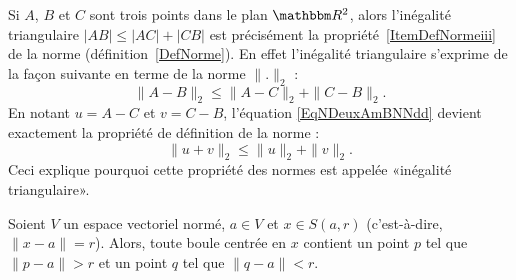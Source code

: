\begin{remark}
	Si $A$, $B$ et $C$ sont trois points dans le plan $\eR^2$, alors l'inégalité triangulaire $| AB |\leq| AC |+| CB |$ est précisément la propriété~\ref{ItemDefNormeiii} de la norme (définition~\ref{DefNorme}). En effet l'inégalité triangulaire s'exprime de la façon suivante en terme de la norme $\| . \|_2$ :
	\begin{equation}	\label{EqNDeuxAmBNNdd}
		\| A-B \|_2\leq \| A-C \|_2+\| C-B \|_2.
	\end{equation}
	En notant $u=A-C$ et $v=C-B$, l'équation \eqref{EqNDeuxAmBNNdd} devient exactement la propriété de définition de la norme :
	\begin{equation}
		\| u+v \|_2\leq \| u \|_2+\| v \|_2.
	\end{equation}
	Ceci explique pourquoi cette propriété des normes est appelée «inégalité triangulaire».
\end{remark}

\begin{proposition}		\label{PropBoitPtLoin}
	Soient \( V \) un espace vectoriel normé, \( a \in V \) et \( x\in S(a,r) \) (c'est-à-dire, \( \|x - a \| = r \)). Alors, toute boule centrée en $x$ contient un point $p$ tel que $\|p - a \| > r$ et un point $q$ tel que $\|q - a \|<r$.
\end{proposition}

